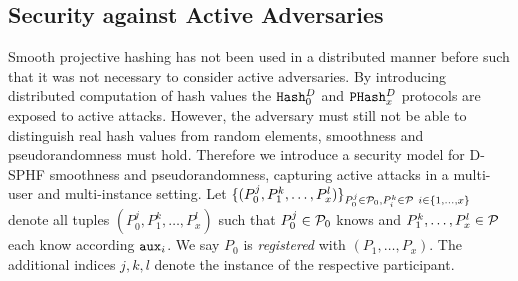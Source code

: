 \subsection{Security against Active Adversaries}
Smooth projective hashing has not been used in a distributed manner before such that it was not necessary to consider active adversaries.
By introducing distributed computation of hash values the $\mathtt{Hash}_0^D$ and $\mathtt{PHash}_x^D$ protocols are exposed to active attacks.
However, the adversary must still not be able to distinguish real hash values from random elements, \ie smoothness and pseudorandomness must hold.
Therefore we introduce a security model for \ac{D-SPHF} smoothness and pseudorandomness, capturing active attacks in a multi-user and multi-instance setting.
Let $\{(P^j_0,P^k_1,\dots,P^l_x)\}_{P_0^j\in\mathcal{P}_0,P^k_i\in\mathcal{P}~i\in\{1,\dots,x\}}$ denote all tuples $(P^j_0,P^k_1,\dots,P^l_x)$ such that $P^j_0\in\mathcal{P}_0$ knows \aux and $P^k_1,\dots,P^l_x\in\mathcal{P}$ each know according $\mathtt{aux}_i$.
We say $P_0$ is \emph{registered} with $(P_1,\dots,P_x)$.
The additional indices $j,k,l$ denote the instance of the respective participant.


